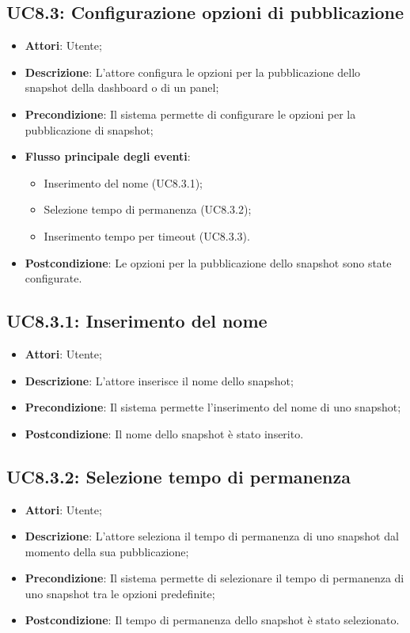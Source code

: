 \subsection{UC8.3: Configurazione opzioni di pubblicazione}
\begin{itemize}
	\item \textbf{Attori}: Utente;
	\item \textbf{Descrizione}: L'attore configura le opzioni per la pubblicazione dello snapshot della dashboard o di un panel;
	\item \textbf{Precondizione}: Il sistema permette di configurare le opzioni per la pubblicazione di snapshot;
	\item \textbf{Flusso principale degli eventi}:
		\begin{itemize}
		\item Inserimento del nome (UC8.3.1);
		\item Selezione tempo di permanenza (UC8.3.2);
		\item Inserimento tempo per timeout (UC8.3.3).
	\end{itemize}
	\item \textbf{Postcondizione}: Le opzioni per la pubblicazione dello snapshot sono state configurate.
\end{itemize}

\subsection{UC8.3.1: Inserimento del nome}
\begin{itemize}
	\item \textbf{Attori}: Utente;
	\item \textbf{Descrizione}: L'attore inserisce il nome dello snapshot;
	\item \textbf{Precondizione}: Il sistema permette l'inserimento del nome di uno snapshot;
	\item \textbf{Postcondizione}: Il nome dello snapshot è stato inserito.
\end{itemize}

\subsection{UC8.3.2: Selezione tempo di permanenza}
\begin{itemize}
	\item \textbf{Attori}: Utente;
	\item \textbf{Descrizione}: L'attore seleziona il tempo di permanenza di uno snapshot dal momento della sua pubblicazione;
	\item \textbf{Precondizione}: Il sistema permette di selezionare il tempo di permanenza di uno snapshot tra le opzioni predefinite;
	\item \textbf{Postcondizione}: Il tempo di permanenza dello snapshot è stato selezionato.
\end{itemize}

